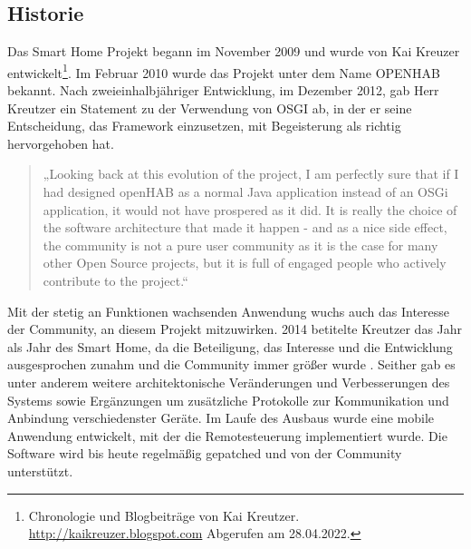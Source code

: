 \subsection*{Historie}
\label{sec:historyoHAB}
    Das Smart Home Projekt begann im November 2009 und wurde von Kai Kreuzer entwickelt\footnote{Chronologie und Blogbeiträge von Kai Kreutzer. \url{http://kaikreuzer.blogspot.com} Abgerufen am 28.04.2022.}. 
    Im Februar 2010 wurde das Projekt unter dem Name \acs{OPENHAB} bekannt. Nach zweieinhalbjähriger Entwicklung, im Dezember 2012, 
    gab Herr Kreutzer ein Statement zu der Verwendung von \acs{OSGI} ab, in der er seine Entscheidung, das Framework einzusetzen, mit Begeisterung 
    als richtig hervorgehoben hat.
    \begin{quote}
        „Looking back at this evolution of the project, I am perfectly sure that if I had designed openHAB as a normal Java 
        application instead of an OSGi application, it would not have prospered as it did. It is really the choice of the 
        software architecture that made it happen - and as a nice side effect, the community is not a pure user community 
        as it is the case for many other Open Source projects, but it is full of engaged people who actively contribute to the 
        project.\cite{kaikreutzer2012}“
    \end{quote} 
Mit der stetig an Funktionen wachsenden Anwendung wuchs auch das Interesse der Community, an diesem Projekt mitzuwirken. 2014 betitelte 
Kreutzer das Jahr als Jahr des Smart Home, da die Beteiligung, das Interesse und die Entwicklung ausgesprochen zunahm und die Community immer 
größer wurde \cite{kaikreutzer2014}. Seither gab es unter anderem weitere architektonische Veränderungen und Verbesserungen des Systems sowie Ergänzungen um 
zusätzliche Protokolle zur Kommunikation und Anbindung verschiedenster Geräte. Im Laufe des Ausbaus wurde eine mobile Anwendung entwickelt, mit der die Remotesteuerung 
implementiert wurde. Die Software wird bis heute regelmäßig gepatched und von der Community unterstützt.


